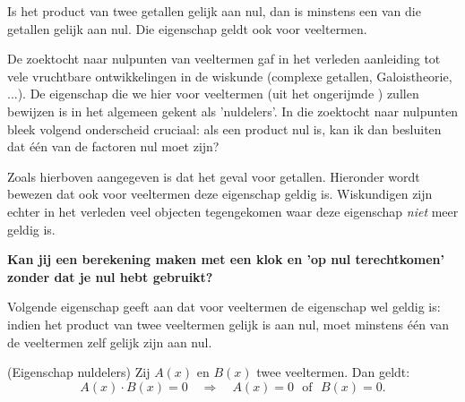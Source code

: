 \documentclass{ximera}
\begin{document}
	\author{Koen de Naeghel - Wiskunde Op Maat}
    \xmsource

	
Is het product van twee getallen gelijk aan nul, dan is minstens een van die getallen gelijk aan nul. Die eigenschap geldt ook voor veeltermen. 

De zoektocht naar nulpunten van veeltermen gaf in het verleden aanleiding tot vele vruchtbare ontwikkelingen in de wiskunde (complexe getallen, Galoistheorie, ...). De eigenschap die we hier voor veeltermen (uit het ongerijmde ) zullen bewijzen is in het algemeen gekent als 'nuldelers'. In die zoektocht naar nulpunten bleek volgend onderscheid cruciaal: als een product nul is, kan ik dan besluiten dat één van de factoren nul moet zijn? 

Zoals hierboven aangegeven is dat het geval voor getallen. Hieronder wordt bewezen dat ook voor veeltermen deze eigenschap geldig is. Wiskundigen zijn echter in het verleden veel objecten tegengekomen waar deze eigenschap \textit{niet} meer geldig is. 

\textbf{Kan jij een berekening maken met een klok en 'op nul terechtkomen' zonder dat je nul hebt gebruikt? }
	

Volgende eigenschap geeft aan dat voor veeltermen de eigenschap wel geldig is: indien het product van twee veeltermen gelijk is aan nul, moet minstens één van de veeltermen zelf gelijk zijn aan nul. 


\begin{proposition}(Eigenschap nuldelers)
Zij $A(x)$ en $B(x)$ twee veeltermen. Dan geldt: 
\[
A(x)\cdot B(x) = 0 \quad \Rightarrow \quad A(x) = 0 \,\,\text{ of } \,\, B(x) = 0.
\]
\end{proposition} 
\end{document}
